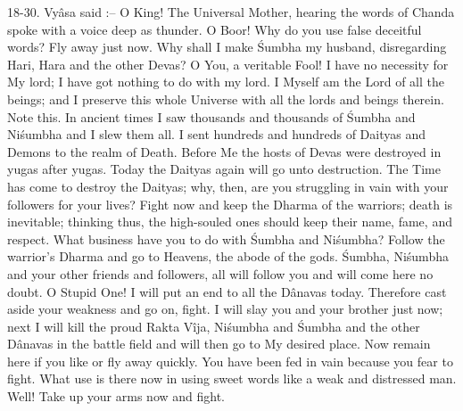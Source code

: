 18-30. Vy\^asa said :-- O King! The Universal Mother, hearing the words of Chanda spoke with a voice deep as thunder. O Boor! Why do you use false deceitful words? Fly away just now. Why shall I make \'Sumbha my husband, disregarding Hari, Hara and the other Devas? O You, a veritable Fool! I have no necessity for My lord; I have got nothing to do with my lord. I Myself am the Lord of all the beings; and I preserve this whole Universe with all the lords and beings therein. Note this. In ancient times I saw thousands and thousands of \'Sumbha and Ni\'sumbha and I slew them all. I sent hundreds and hundreds of Daityas and Demons to the realm of Death. Before Me the hosts of Devas were destroyed in yugas after yugas. Today the Daityas again will go unto destruction. The Time has come to destroy the Daityas; why, then, are you struggling in vain with your followers for your lives? Fight now and keep the Dharma of the warriors; death is inevitable; thinking thus, the high-souled ones should keep their name, fame, and respect. What business have you to do with \'Sumbha and Ni\'sumbha? Follow the warrior's Dharma and go to Heavens, the abode of the gods. \'Sumbha, Ni\'sumbha and your other friends and followers, all will follow you and will come here no doubt. O Stupid One! I will put an end to all the D\^anavas today. Therefore cast aside your weakness and go on, fight. I will slay you and your brother just now; next I will kill the proud Rakta V\^ija, Ni\'sumbha and \'Sumbha and the other D\^anavas in the battle field and will then go to My desired place. Now remain here if you like or fly away quickly. You have been fed in vain because you fear to fight. What use is there now in using sweet words like a weak and distressed man. Well! Take up your arms now and fight.

